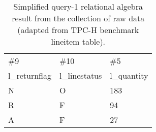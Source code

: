 \begin{table}[H]
\caption{Simplified query-1 relational algebra result from the collection of raw data (adapted from TPC-H benchmark lineitem table). }
\label{table:results_simple_query_1}
\scriptsize
\centering
\begin{tabular}{ |  L{1.5cm} |  L{1.5cm}  |  L{1.5cm}  |    } 
\hline
\#9	&	\#10		 & \#5	  \\ 
l\_returnflag	&	l\_linestatus	&	 l\_quantity 	  \\ \hline
\hline
N	&	O	&	183	  \\ \hline
R	&	F	&	94	  \\ \hline
A	&	F	&	27	  \\ \hline
\end{tabular}

\end{table}
